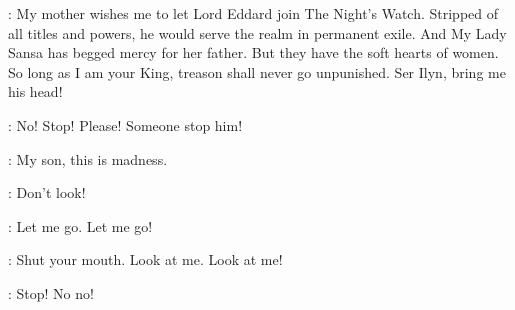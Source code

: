 \JOFFREY: My mother wishes me to let Lord Eddard join The Night's Watch. Stripped of all titles and powers, he would serve the realm in permanent exile. And My Lady Sansa has begged mercy for her father. But they have the soft hearts of women. So long as I am your King, treason shall never go unpunished. Ser Ilyn, bring me his head! 


\SANSA: No! Stop! Please! Someone stop him! 

\CERSEI: My son, this is madness. 


\YOREN: Don't look! 

\ARYA: Let me go. Let me go! 

\YOREN: Shut your mouth. Look at me. Look at me! 

\SANSA: Stop! No no! 



